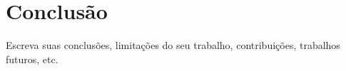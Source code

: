 \chapter[Conclusão]{Conclusão}
\label{ch:conclusao}

Escreva suas conclusões, limitações do seu trabalho, contribuições, trabalhos futuros, etc.